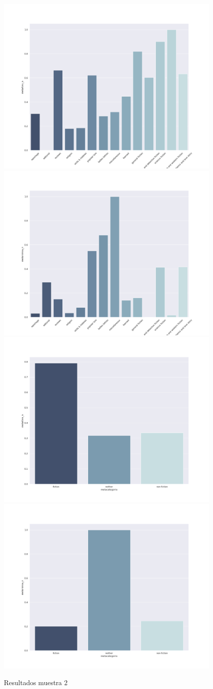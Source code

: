 \documentclass[twoside]{article}
\begin{document}
\begin{figure}[!H]
\centering
\includegraphics[width=.45\linewidth]{./resultados/graphs/muestra/c2_metafora.png}
\includegraphics[width=.45\linewidth]{./resultados/graphs/muestra/c2_metonimia.png}
\includegraphics[width=.45\linewidth]{./resultados/graphs/meta/c2_metacategoria_metafora.png}
\includegraphics[width=.45\linewidth]{./resultados/graphs/meta/c2_metacategoria_metonimia.png}
\caption{\label{fig:c2_resultados}Resultados muestra 2}
\end{figure}
\end{document}
